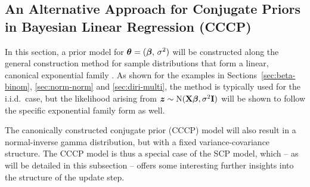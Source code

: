 \subsection{An Alternative Approach for Conjugate Priors in Bayesian Linear Regression (CCCP)}
\label{sec:cccp}


In this section, a prior model for $\boldsymbol{\theta} = (\boldsymbol{\beta},\,\sigma^2)$ will be constructed
along the general construction method for sample distributions that form a
linear, canonical exponential family
\parencite[see the canical conjugates framework in Section~\ref{sec:regularconjugates}, and, e.g.,][]{2000:bernardosmith}.
%
As shown for the examples in Sections~\ref{sec:beta-binom}, \ref{sec:norm-norm} and \ref{sec:diri-multi},
the method is typically used for the i.i.d.\ case, but the likelihood arising from
${\bm z} \sim \operatorname{N}(\mathbf{X}\boldsymbol{\beta}, \sigma^2\mathbf{I})$ will be shown to follow the specific
exponential family form as well.

The canonically constructed conjugate prior (CCCP) model will
also result in a normal-inverse gamma distribution, but with a fixed variance-covariance structure.
The CCCP model is thus a special case of the SCP model, which -- as will be detailed in this subsection --
offers some interesting further insights into the structure of the update step.




